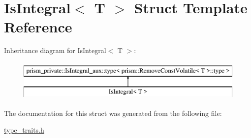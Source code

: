 \hypertarget{struct_is_integral}{}\section{Is\+Integral$<$ T $>$ Struct Template Reference}
\label{struct_is_integral}
Inheritance diagram for Is\+Integral$<$ T $>$\+:\begin{figure}[H]
\begin{center}
\leavevmode
\includegraphics[height=2.000000cm]{struct_is_integral}
\end{center}
\end{figure}


The documentation for this struct was generated from the following file\+:\begin{DoxyCompactItemize}
\item 
\hyperlink{type__traits_8h}{type\+\_\+traits.\+h}\end{DoxyCompactItemize}
